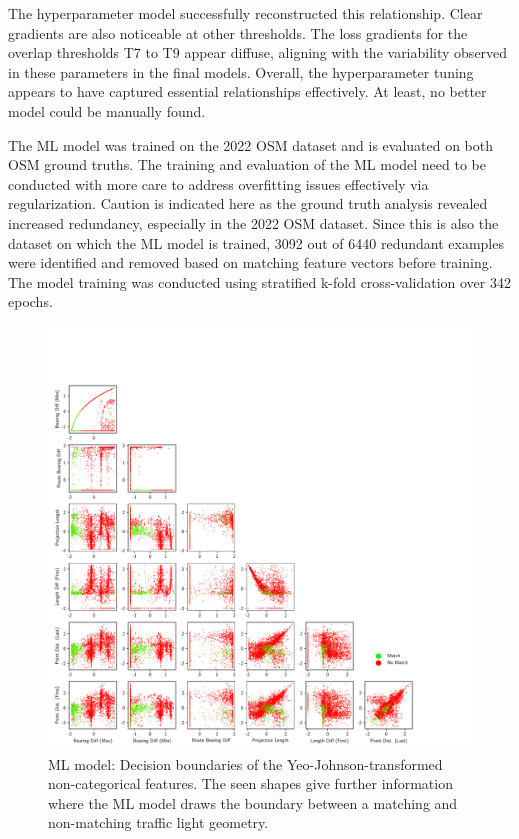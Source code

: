The hyperparameter model successfully reconstructed this relationship. Clear gradients are also noticeable at other thresholds. The loss gradients for the overlap thresholds T7 to T9 appear diffuse, aligning with the variability observed in these parameters in the final models. Overall, the hyperparameter tuning appears to have captured essential relationships effectively. At least, no better model could be manually found.

The ML model was trained on the 2022 OSM dataset and is evaluated on both OSM ground truths. The training and evaluation of the ML model need to be conducted with more care to address overfitting issues effectively via regularization. Caution is indicated here as the ground truth analysis revealed increased redundancy, especially in the 2022 OSM dataset. Since this is also the dataset on which the ML model is trained, 3092 out of 6440 redundant examples were identified and removed based on matching feature vectors before training. The model training was conducted using stratified k-fold cross-validation over 342 epochs.

\begin{figure}[!t]
\centering 
\includegraphics[width=\linewidth,bb=0 0 760 760]{images/decision-boundaries.pdf}
\caption{ML model: Decision boundaries of the Yeo-Johnson-transformed non-categorical features. The seen shapes give further information where the ML model draws the boundary between a matching and non-matching traffic light geometry.}
\label{fig:ml-model-decision-boundaries}
\end{figure}

